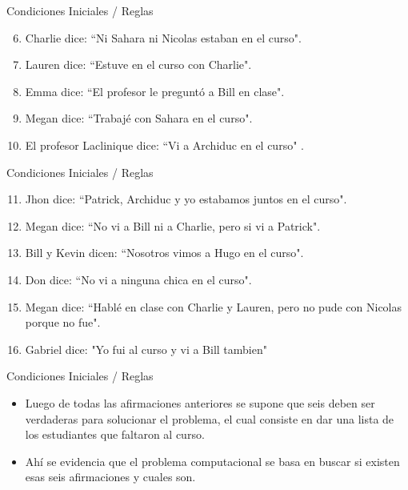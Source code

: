 \documentclass[10pt]{beamer}
\begin{document}
\begin{frame}[fragile]{Condiciones Iniciales / Reglas}
    \begin{enumerate}
    \setcounter{enumi}{5}
        \item Charlie dice: \textquotedblleft Ni Sahara ni Nicolas estaban en el curso".
        \item Lauren dice: \textquotedblleft Estuve en el curso con Charlie".
        \item Emma dice: \textquotedblleft El profesor le preguntó a Bill en clase".
        \item Megan dice: \textquotedblleft Trabajé con Sahara en el curso".
        \item El profesor Laclinique dice: \textquotedblleft Vi a Archiduc en el curso" .
    \end{enumerate}
\end{frame}


\begin{frame}[fragile]{Condiciones Iniciales / Reglas}
    \begin{enumerate}
    \setcounter{enumi}{10}
        \item Jhon dice: \textquotedblleft Patrick, Archiduc y yo estabamos juntos en el curso".
        \item Megan dice: \textquotedblleft No vi a Bill ni a Charlie, pero si vi a Patrick".
        \item Bill y Kevin dicen: \textquotedblleft Nosotros vimos a Hugo en el curso".
        \item Don dice: \textquotedblleft No vi a ninguna chica en el curso".
        \item Megan dice: \textquotedblleft Hablé en clase con Charlie y Lauren, pero no pude con Nicolas porque no fue".
        \item Gabriel dice: "Yo fui al curso y vi a Bill tambien"
    \end{enumerate}
\end{frame}

\begin{frame}[fragile]{Condiciones Iniciales / Reglas}
    \begin{itemize}
        \item Luego de todas las afirmaciones anteriores se supone que seis deben ser verdaderas para solucionar el problema, el cual consiste en dar una lista de los estudiantes que faltaron al curso.
        \item Ahí se evidencia que el problema computacional se basa en buscar si existen esas seis afirmaciones y cuales son. 
    \end{itemize}
\end{frame}
\end{document}
